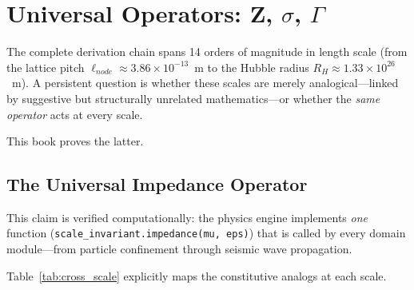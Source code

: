 
\chapter{Universal Operators: Z, $\sigma$, $\Gamma$}
\label{ch:universal_operators}

The complete derivation chain spans 14 orders of magnitude
in length scale (from the lattice pitch $\ell_{node} \approx 3.86 \times
10^{-13}$~m to the Hubble radius $R_H \approx 1.33 \times 10^{26}$~m).
A persistent question is whether these scales are merely analogical---linked
by suggestive but structurally unrelated mathematics---or whether the
\textit{same operator} acts at every scale.

This book proves the latter.

\section{The Universal Impedance Operator}
\label{sec:universal_impedance}

\noindent{}

\medskip
\noindent
This claim is verified computationally: the physics engine implements
\textit{one} function (\texttt{scale\_invariant.impedance(mu, eps)}) that
is called by every domain module---from particle confinement through
seismic wave propagation.

Table~\ref{tab:cross_scale} explicitly maps the constitutive analogs at
each scale.

